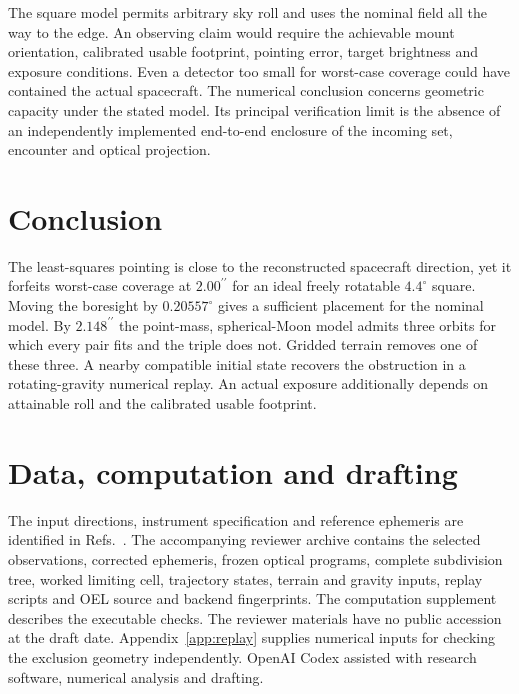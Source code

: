 \documentclass[10pt,letterpaper]{article}
\newcommand{\degc}{^{\circ}}
\newcommand{\as}{^{\prime\prime}}
\begin{document}
The square model permits arbitrary sky roll and uses the nominal field all the way to the edge. An observing claim would require the achievable mount orientation, calibrated usable footprint, pointing error, target brightness and exposure conditions. Even a detector too small for worst-case coverage could have contained the actual spacecraft. The numerical conclusion concerns geometric capacity under the stated model. Its principal verification limit is the absence of an independently implemented end-to-end enclosure of the incoming set, encounter and optical projection.

\section{Conclusion}
The least-squares pointing is close to the reconstructed spacecraft direction, yet it forfeits worst-case coverage at $2.00\as$ for an ideal freely rotatable $4.4\degc$ square. Moving the boresight by $0.20557\degc$ gives a sufficient placement for the nominal model. By $2.148\as$ the point-mass, spherical-Moon model admits three orbits for which every pair fits and the triple does not. Gridded terrain removes one of these three. A nearby compatible initial state recovers the obstruction in a rotating-gravity numerical replay. An actual exposure additionally depends on attainable roll and the calibrated usable footprint.

\section*{Data, computation and drafting}
The input directions, instrument specification and reference ephemeris are identified in Refs.~\cite{astrometry,camera,horizons}. The accompanying reviewer archive contains the selected observations, corrected ephemeris, frozen optical programs, complete subdivision tree, worked limiting cell, trajectory states, terrain and gravity inputs, replay scripts and OEL source and backend fingerprints. The computation supplement describes the executable checks. The reviewer materials have no public accession at the draft date. Appendix~\ref{app:replay} supplies numerical inputs for checking the exclusion geometry independently. OpenAI Codex assisted with research software, numerical analysis and drafting.

\appendix
\end{document}
